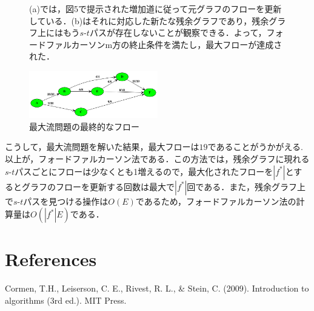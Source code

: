 \documentclass[
]{ltjarticle}
\begin{document}
\begin{figure}%
    \centering
    \qquad
    \caption{(a)では，図5で提示された増加道に従って元グラフのフローを更新している．(b)はそれに対応した新たな残余グラフであり，残余グラフ上にはもう$s$-$t$パスが存在しないことが観察できる．よって，フォードファルカーソンm方の終止条件を満たし，最大フローが達成された．}
\end{figure}

\begin{figure}
\centering
\includegraphics[width=0.5\textwidth]{4.png}
\caption{最大流問題の最終的なフロー}
\end{figure}

\newpage

こうして，最大流問題を解いた結果，最大フローは\(19\)であることがうかがえる.\\
以上が，フォードファルカーソン法である．この方法では，残余グラフに現れる\(s\)-\(t\)パスごとにフローは少なくとも1増えるので，最大化されたフローを\(|f^*|\)とするとグラフのフローを更新する回数は最大で\(|f^*|\)回である．また，残余グラフ上で\(s\)-\(t\)パスを見つける操作は\(O(E)\)であるため，フォードファルカーソン法の計算量は\(O(|f^*|E)\)である．

\hypertarget{references}{%
\section{References}\label{references}}

\setlength{\parindent}{-0.2in}
\setlength{\leftskip}{0.2in}
\setlength{\parskip}{8pt}

\noindent

Cormen, T.H., Leiserson, C. E., Rivest, R. L., \& Stein, C. (2009).
Introduction to algorithms (3rd ed.). MIT Press.
\end{document}
